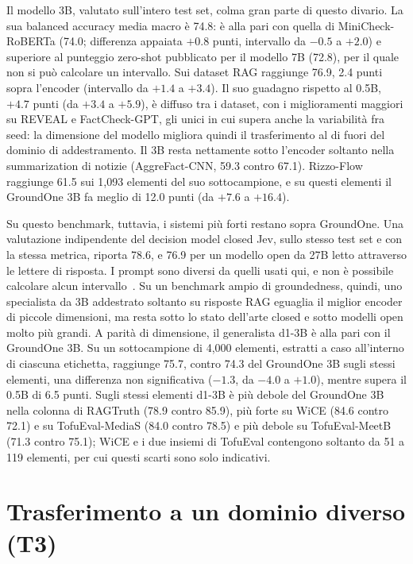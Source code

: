 Il modello 3B, valutato sull'intero test set, colma gran parte di questo divario. La sua balanced accuracy media macro è
74.8: è alla pari con quella di MiniCheck-RoBERTa (74.0; differenza appaiata $+0.8$ punti, intervallo da $-0.5$ a $+2.0$) e superiore al punteggio zero-shot pubblicato per il modello 7B (72.8), per il quale non si può calcolare un
intervallo. Sui dataset RAG raggiunge 76.9, 2.4 punti sopra l'encoder (intervallo da $+1.4$ a $+3.4$). Il suo guadagno
rispetto al 0.5B, $+4.7$ punti (da $+3.4$ a $+5.9$), è diffuso tra i dataset, con i miglioramenti maggiori su REVEAL e FactCheck-GPT, gli unici in cui supera anche la variabilità fra seed: la dimensione del modello migliora quindi il trasferimento al di fuori del dominio di
addestramento. Il 3B resta nettamente sotto l'encoder soltanto nella summarization di notizie (AggreFact-CNN, 59.3
contro 67.1). Rizzo-Flow raggiunge 61.5 sui 1{,}093 elementi del suo sottocampione, e su questi elementi il GroundOne 3B
fa meglio di 12.0 punti (da $+7.6$ a $+16.4$).

Su questo benchmark, tuttavia, i sistemi più forti restano sopra GroundOne. Una valutazione indipendente del decision model
closed Jev, sullo stesso test set e con la stessa metrica, riporta 78.6, e 76.9 per un modello open da 27B letto
attraverso le lettere di risposta. I prompt sono diversi da quelli usati qui, e non è possibile calcolare alcun
intervallo~\cite{deusser2026jev}. Su un benchmark ampio di groundedness, quindi, uno specialista da 3B addestrato
soltanto su risposte RAG eguaglia il miglior encoder di piccole dimensioni, ma resta sotto lo stato dell'arte closed e
sotto modelli open molto più grandi. A parità di dimensione, il generalista d1-3B è alla pari con il GroundOne 3B. Su un sottocampione di 4{,}000 elementi, estratti a caso all'interno di ciascuna etichetta, raggiunge 75.7, contro 74.3 del GroundOne 3B sugli stessi elementi, una
differenza non significativa ($-1.3$, da $-4.0$ a $+1.0$), mentre supera il 0.5B di 6.5 punti. Sugli stessi elementi d1-3B è più debole del GroundOne 3B nella colonna di RAGTruth (78.9 contro 85.9), più forte su WiCE (84.6 contro 72.1) e su TofuEval-MediaS (84.0 contro 78.5) e più debole su TofuEval-MeetB (71.3 contro 75.1); WiCE e i due insiemi di TofuEval contengono soltanto da 51 a 119 elementi, per cui questi scarti sono solo indicativi.

\section{Trasferimento a un dominio diverso (T3)}
\label{sec:results-t3}

